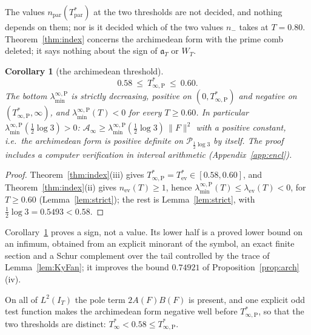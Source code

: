 \documentclass[11pt]{amsart}
\newtheorem{corollary}[theorem]{Corollary}
\theoremstyle{definition}
\theoremstyle{remark}
\newcommand{\IT}{I_T}
\newcommand{\Ainf}{\mathcal A_\infty}
\newcommand{\laminfP}{\lambda^{\infty,\mathrm P}_{\min}}
\begin{document}
The values $n_{\mathrm{par}}(T^*_{\mathrm{par}})$
at the two thresholds are not decided, and nothing depends on them; nor is it decided which of the two
values $n_-$ takes at $T=0.80$. Theorem~\ref{thm:index} concerns the
archimedean form with the prime comb deleted; it says nothing about the sign of $\mathfrak a_T$ or
$W_T$.


\begin{corollary}[the archimedean threshold]\label{cor:Tarch}
\[
0.58\ \le\ T^*_{\infty,\mathrm P}\ \le\ 0.60 .
\]
The bottom $\laminfP$ is strictly decreasing, positive on $(0,T^*_{\infty,\mathrm P})$ and negative on
$(T^*_{\infty,\mathrm P},\infty)$, and $\laminfP(T)<0$ for every $T\ge0.60$. In particular
$\laminfP(\frac12\log3)>0$: $\Ainf\ge\laminfP(\frac12\log3)\,\|F\|^2$ with a positive constant, i.e.\
the archimedean form is positive definite on $\mathcal P_{\frac12\log3}$ by itself. The proof
includes a computer verification in interval arithmetic (Appendix~\ref{app:encl}).
\end{corollary}
\begin{proof}
Theorem~\ref{thm:index}(iii) gives
$T^*_{\infty,\mathrm P}=T^*_{\mathrm{ev}}\in[0.58,0.60]$, and Theorem~\ref{thm:index}(ii) gives
$n_{\mathrm{ev}}(T)\ge1$, hence $\laminfP(T)\le\lambda_{\mathrm{ev}}(T)<0$, for $T\ge0.60$
(Lemma~\ref{lem:strict}); the rest is Lemma~\ref{lem:strict}, with $\frac12\log3=0.5493<0.58$.
\end{proof}
Corollary~\ref{cor:Tarch} proves a sign, not a value. Its lower half is a proved lower bound on an
infimum, obtained from an explicit minorant of the symbol, an exact finite section and a Schur
complement over the tail controlled by the trace of Lemma~\ref{lem:KyFan}; it improves the bound
$0.74921$ of Proposition~\ref{prop:arch}(iv).

On all of $L^2(\IT)$ the pole term $2A(F)B(F)$ is present, and one explicit odd test function makes
the archimedean form negative well before $T^*_{\infty,\mathrm P}$, so that the two thresholds are distinct:
$T^*_\infty<0.58\le T^*_{\infty,\mathrm P}$.
\end{document}
